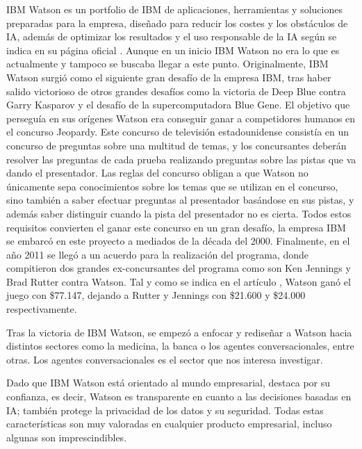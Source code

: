 IBM Watson es un \gls{portfolio} de IBM de aplicaciones, herramientas y soluciones preparadas para la empresa, diseñado para reducir los costes y los obstáculos de \gls{IA}, además de optimizar los resultados y el uso responsable de la \gls{IA} según se indica en su página oficial \cite{RefWorks:RefID:15-2021ibm}. Aunque en un inicio IBM Watson no era lo que es actualmente y tampoco se buscaba llegar a este punto. Originalmente, IBM Watson surgió como el siguiente gran desafío de la empresa IBM, tras haber salido victorioso de otros grandes desafíos como la victoria de Deep Blue contra Garry Kasparov y el desafío de la supercomputadora Blue Gene. El objetivo que perseguía en sus orígenes Watson era conseguir ganar a competidores humanos en el concurso Jeopardy. Este concurso de televisión estadounidense consistía en un concurso de preguntas sobre una multitud de temas, y los concursantes deberán resolver las preguntas de cada prueba realizando preguntas sobre las pistas que va dando el presentador. Las reglas del concurso obligan a que Watson no únicamente sepa conocimientos sobre los temas que se utilizan en el concurso, sino también a saber efectuar preguntas al presentador basándose en sus pistas, y además saber distinguir cuando la pista del presentador no es cierta. Todos estos requisitos convierten el ganar este concurso en un gran desafío, la empresa IBM se embarcó en este proyecto a mediados de la década del 2000. Finalmente, en el año 2011 se llegó a un acuerdo para la realización del programa, donde compitieron dos grandes ex-concursantes del programa como son Ken Jennings y Brad Rutter contra Watson. Tal y como se indica en el artículo \cite{RefWorks:RefID:16-best2013ibm}, Watson ganó el juego con \$77.147, dejando a Rutter y Jennings con \$21.600 y \$24.000 respectivamente.

Tras la victoria de IBM Watson, se empezó a enfocar y rediseñar a Watson hacia distintos sectores como la medicina, la banca o los agentes conversacionales, entre otras. Los agentes conversacionales es el sector que nos interesa investigar.

Dado que IBM Watson está orientado al mundo empresarial, destaca por su confianza, es decir, Watson es transparente en cuanto a las decisiones basadas en \gls{IA}; también protege la privacidad de los datos y su seguridad. Todas estas características son muy valoradas en cualquier producto empresarial, incluso algunas son imprescindibles.

